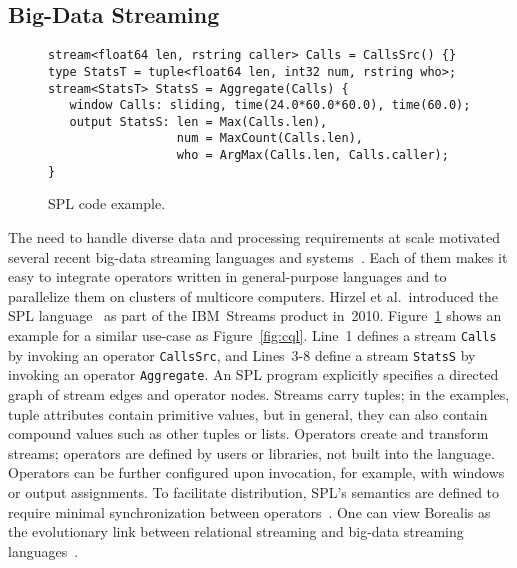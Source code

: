 \subsection{Big-Data Streaming}\label{sec:big} %

\begin{figure}[!h]
\begin{lstlisting}[xleftmargin=1mm]
stream<float64 len, rstring caller> Calls = CallsSrc() {}
type StatsT = tuple<float64 len, int32 num, rstring who>;
stream<StatsT> StatsS = Aggregate(Calls) {
   window Calls: sliding, time(24.0*60.0*60.0), time(60.0);
   output StatsS: len = Max(Calls.len),
                  num = MaxCount(Calls.len),
                  who = ArgMax(Calls.len, Calls.caller);
}
\end{lstlisting}
\vspace*{-4mm}
\caption{\label{fig:spl}SPL code example.}
\end{figure}

The need to handle diverse data and processing requirements at scale
motivated several recent big-data streaming languages and
systems~\cite{akidau_et_al_2013,carbone_et_al_2015,hirzel_schneider_gedik_2017,toshniwal_et_al_2014,zaharia_et_al_2013}.
Each of them makes it easy to integrate operators written in
general-purpose languages and to parallelize them on clusters of
multicore computers. Hirzel et al.\ introduced the SPL
language~\cite{hirzel_schneider_gedik_2017} as part of the IBM~Streams
product in~2010. Figure~\ref{fig:spl} shows an example for a similar
use-case as Figure~\ref{fig:cql}. Line~1 defines a stream
\lstinline{Calls} by invoking an operator \lstinline{CallsSrc}, and
\mbox{Lines 3-8} define a stream \lstinline{StatsS} by invoking an
operator \lstinline{Aggregate}. An SPL program explicitly specifies a
directed graph of stream edges and operator nodes. Streams carry
tuples; in the examples, tuple attributes contain primitive values,
but in general, they can also contain compound values such as other
tuples or lists.  Operators create and transform streams; operators
are defined by users or libraries, not built into the
language. Operators can be further configured upon invocation, for
example, with windows or output assignments. To facilitate
distribution, SPL's semantics are defined to require minimal
synchronization between operators~\cite{soule_et_al_2016}. One can
view Borealis as the evolutionary link between relational streaming
and big-data streaming languages~\cite{abadi_et_al_2005}.

